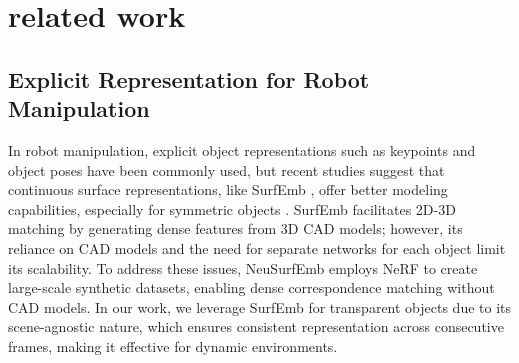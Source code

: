 

\section{related work}
\label{sec:relatedwork}

\subsection{Explicit Representation for Robot Manipulation}


In robot manipulation, explicit object representations such as keypoints \cite{mjeon-2022-ral} and object poses have been commonly used, but recent studies suggest that continuous surface representations, like SurfEmb \cite{haugaard2022surfemb}, offer better modeling capabilities, especially for symmetric objects \cite{haugaard2023multi}. SurfEmb facilitates 2D-3D matching by generating dense features from 3D CAD models; however, its reliance on CAD models and the need for separate networks for each object limit its scalability. To address these issues, NeuSurfEmb \cite{milano2024neusurfemb} employs \ac{NeRF} to create large-scale synthetic datasets, enabling dense correspondence matching without CAD models. In our work, we leverage SurfEmb for transparent objects due to its scene-agnostic nature, which ensures consistent representation across consecutive frames, making it effective for dynamic environments.

